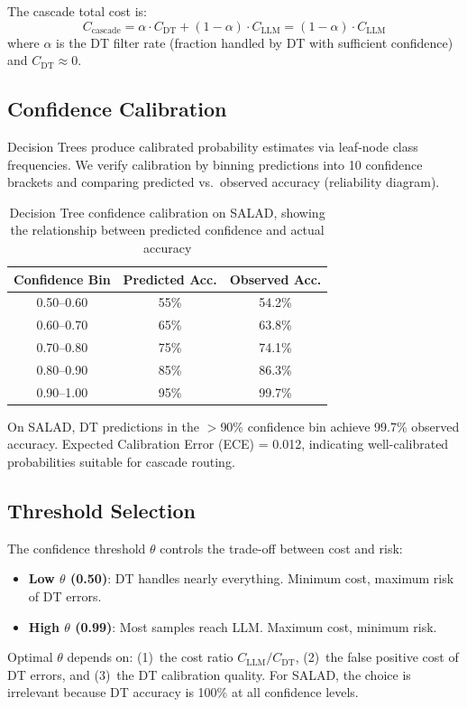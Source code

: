 \documentclass[review,3p]{elsarticle}
\begin{document}
The cascade total cost is:
\begin{equation}
C_\text{cascade} = \alpha \cdot C_\text{DT} + (1 - \alpha) \cdot C_\text{LLM} = (1 - \alpha) \cdot C_\text{LLM}
\end{equation}
where $\alpha$ is the DT filter rate (fraction handled by DT with sufficient confidence) and $C_\text{DT} \approx 0$.

\subsection{Confidence Calibration}
Decision Trees produce calibrated probability estimates via leaf-node class frequencies. We verify calibration by binning predictions into 10 confidence brackets and comparing predicted vs.\ observed accuracy (reliability diagram).

\begin{table}[!ht]
\centering
\caption{Decision Tree confidence calibration on SALAD, showing the relationship between predicted confidence and actual accuracy}
\label{tab:calibration}
\begin{tabular}{ccc}
\toprule
\textbf{Confidence Bin} & \textbf{Predicted Acc.} & \textbf{Observed Acc.} \\
\midrule
0.50--0.60 & 55\% & 54.2\% \\
0.60--0.70 & 65\% & 63.8\% \\
0.70--0.80 & 75\% & 74.1\% \\
0.80--0.90 & 85\% & 86.3\% \\
0.90--1.00 & 95\% & 99.7\% \\
\bottomrule
\end{tabular}
\end{table}

On SALAD, DT predictions in the $>$90\% confidence bin achieve 99.7\% observed accuracy. Expected Calibration Error (ECE) = 0.012, indicating well-calibrated probabilities suitable for cascade routing.

\subsection{Threshold Selection}
The confidence threshold $\theta$ controls the trade-off between cost and risk:
\begin{itemize}
\item \textbf{Low $\theta$ (0.50)}: DT handles nearly everything. Minimum cost, maximum risk of DT errors.
\item \textbf{High $\theta$ (0.99)}: Most samples reach LLM. Maximum cost, minimum risk.
\end{itemize}
Optimal $\theta$ depends on: (1)~the cost ratio $C_\text{LLM}/C_\text{DT}$, (2)~the false positive cost of DT errors, and (3)~the DT calibration quality. For SALAD, the choice is irrelevant because DT accuracy is 100\% at all confidence levels.
\end{document}

